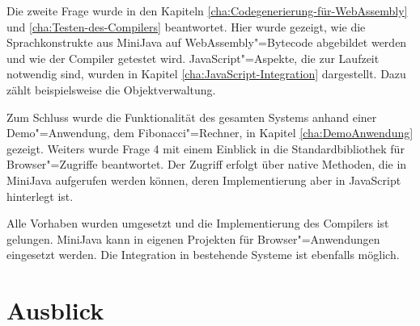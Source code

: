 Die zweite Frage wurde in den Kapiteln \ref{cha:Codegenerierung-für-WebAssembly} und \ref{cha:Testen-des-Compilers} beantwortet. Hier wurde gezeigt, wie die Sprachkonstrukte aus MiniJava auf WebAssembly"=Bytecode abgebildet werden und wie der Compiler getestet wird. JavaScript"=Aspekte, die zur Laufzeit notwendig sind, wurden in Kapitel \ref{cha:JavaScript-Integration} dargestellt. Dazu zählt beispielsweise die Objektverwaltung.

Zum Schluss wurde die Funktionalität des gesamten Systems anhand einer Demo"=Anwendung, dem Fibonacci"=Rechner, in Kapitel \ref{cha:DemoAnwendung} gezeigt. Weiters wurde Frage 4 mit einem Einblick in die Standardbibliothek für Browser"=Zugriffe beantwortet. Der Zugriff erfolgt über native Methoden, die in MiniJava aufgerufen werden können, deren Implementierung aber in JavaScript hinterlegt ist.

Alle Vorhaben wurden umgesetzt und die Implementierung des Compilers ist gelungen. MiniJava kann in eigenen Projekten für Browser"=Anwendungen eingesetzt werden. Die Integration in bestehende Systeme ist ebenfalls möglich.

\section{Ausblick}

